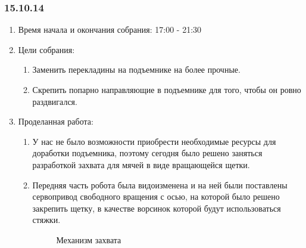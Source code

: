 
\subsubsection{15.10.14}

\begin{enumerate}
	\item Время начала и окончания собрания:
	17:00 - 21:30
	\item Цели собрания:
	\begin{enumerate}
	  \item Заменить перекладины на подъемнике на более прочные.
	  
	  \item Скрепить попарно направляющие в подъемнике для того, чтобы он ровно раздвигался.
	  
    \end{enumerate}
    
	\item Проделанная работа:
	\begin{enumerate}
	  \item У нас не было возможности приобрести необходимые ресурсы для доработки подъемника, поэтому сегодня было решено заняться разработкой захвата для мячей в виде вращающейся щетки.
      
      \item  Передняя часть робота была видоизменена и на ней были поставлены сервопривод свободного вращения с осью, на которой было решено закрепить щетку, в качестве ворсинок которой будут использоваться стяжки.
      
     \begin{figure}[H]
     	\begin{minipage}[h]{1\linewidth}
     		\caption{Механизм захвата}
     	\end{minipage}
     \end{figure}
      

\end{enumerate}
\end{enumerate}
